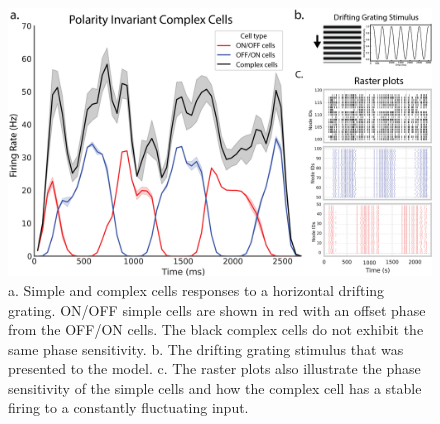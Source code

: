 \documentclass[12pt]{article}
\begin{document}
\begin{figure}[H]
    \centering
    \includegraphics[width=1 \textwidth]{figures/complex_invariance_figure.png}
    \caption{a. Simple and complex cells responses to a horizontal drifting grating. ON/OFF simple cells are shown in red with an offset phase from the OFF/ON cells. The black complex cells do not exhibit the same phase sensitivity. b. The drifting grating stimulus that was presented to the model. c. The raster plots also illustrate the phase sensitivity of the simple cells and how the complex cell has a stable firing to a constantly fluctuating input.}
    \label{fig:polarity invariance}
\end{figure}
\end{document}
